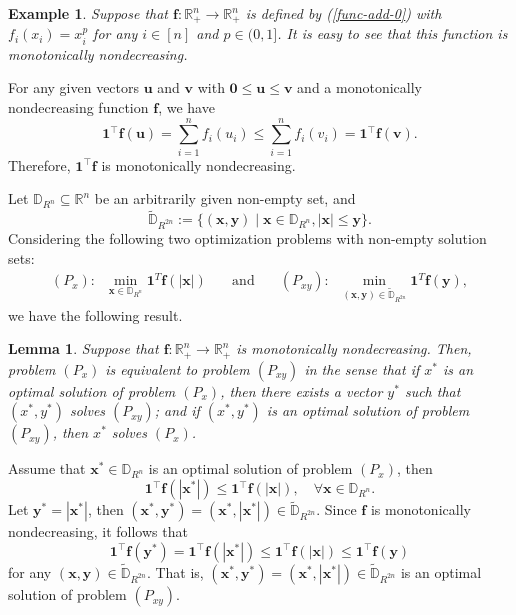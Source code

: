 \documentclass[12pt]{article}
\newtheorem{Lemma}{Lemma}[part]
\newtheorem{Example}{Example}[part]
\begin{document}
\begin{Example}\label{on-lp-fun}
Suppose that $\mathbf{f}: \mathbb{R}^n_{+}\rightarrow\mathbb{R}^n_+$ is defined by (\ref{func-add-0}) with $f_i(x_i)=x_i^p$ for any $i\in[n]$ and $p\in (0,1]$. It is easy to see that this function is monotonically nondecreasing.
\end{Example}

For any given vectors $\mathbf{u}$ and $\mathbf{v}$ with $\mathbf{0}\leqslant\mathbf{u}\leqslant \mathbf{v}$ and a monotonically nondecreasing function $\mathbf{f}$, we have
$$
\mathbf{1}^{\top}\mathbf{f}(\mathbf{u})=\sum\limits_{i=1}^{n}{f_{i}(u_i)}\leqslant
\sum\limits_{i=1}^{n}{f_{i}(v_i)}=\mathbf{1}^{\top}\mathbf{f}(\mathbf{v}).
$$
Therefore, $\mathbf{1}^{\top}\mathbf{f}$ is monotonically nondecreasing.

Let $\mathbb{D}_{R^n}\subseteq \mathbb{R}^n$ be an arbitrarily given non-empty set, and
$$
\tilde{\mathbb{D}}_{R^{2n}}:=\{(\mathbf{x},\mathbf{y})\mid \mathbf{x}\in \mathbb{D}_{R^n}, |\mathbf{x}|\leqslant\mathbf{y}\}.
$$
Considering the following two  optimization problems with non-empty solution sets:
\begin{eqnarray}
(P_{x}):\;\;\min\limits_{\mathbf{x}\in \mathbb{D}_{R^n}}\mathbf{1}^{T}\mathbf{f}(|\mathbf{x}|)\quad
&\mathrm{and}&\quad
(P_{xy}):\;\;\min\limits_{(\mathbf{x},\mathbf{y})\in \tilde{\mathbb{D}}_{R^{2n}}}\mathbf{1}^{T}\mathbf{f}(\mathbf{y}),\nonumber
\end{eqnarray}
we have the following result.
\begin{Lemma}\label{add-thm1-1}
Suppose that $\mathbf{f}: \mathbb{R}^n_{+}\rightarrow \mathbb{R}^{n}_{+}$ is monotonically nondecreasing. Then, problem $(P_{x})$ is equivalent to problem $(P_{xy})$ in the sense that if $x^*$ is an optimal solution of problem $(P_{x})$, then there exists a vector $y^*$ such that $(x^*,y^*)$ solves $(P_{xy})$; and if $(x^*,y^*)$ is an optimal solution of problem $(P_{xy})$, then $x^*$ solves $(P_{x})$.
\end{Lemma}

 Assume that $\mathbf{x}^\ast\in\mathbb{D}_{R^{n}}$ is an optimal solution of problem $(P_{x})$, then
$$
\mathbf{1}^{\top}\mathbf{f}(|\mathbf{x}^\ast|)\leqslant\mathbf{1}^{\top}\mathbf{f}(|\mathbf{x}|),
\quad \forall \mathbf{x}\in \mathbb{D}_{R^{n}}.
$$
Let $\mathbf{y}^\ast=|\mathbf{x}^\ast|$, then $(\mathbf{x}^\ast, \mathbf{y}^\ast)=(\mathbf{x}^\ast, |\mathbf{x}^\ast|)\in\tilde{\mathbb{D}}_{R^{2n}}$. Since $\mathbf{f}$ is monotonically nondecreasing, it follows that
$$
\mathbf{1}^{\top}\mathbf{f}(\mathbf{y}^\ast)=\mathbf{1}^{\top}\mathbf{f}(|\mathbf{x}^\ast|)\leqslant \mathbf{1}^{\top}\mathbf{f}(|\mathbf{x}|)\leqslant\mathbf{1}^{\top}\mathbf{f}(\mathbf{y})
$$
for any $(\mathbf{x},\mathbf{y})\in \tilde{\mathbb{D}}_{R^{2n}}$. That is, $(\mathbf{x}^\ast, \mathbf{y}^\ast)=(\mathbf{x}^\ast, |\mathbf{x}^\ast|)\in\tilde{\mathbb{D}}_{R^{2n}}$ is an
optimal solution of problem $(P_{xy})$.
\end{document}
